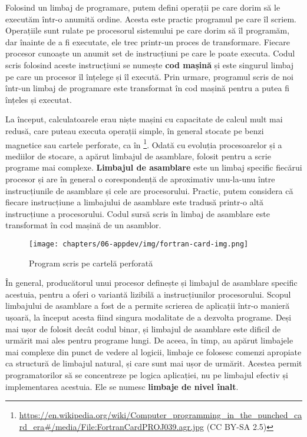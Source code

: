 Folosind un limbaj de programare, putem defini operații pe care dorim să le executăm într-o anumită ordine.
Acesta este practic programul pe care îl scriem.
Operațiile sunt rulate pe procesorul sistemului pe care dorim să îl programăm, dar înainte de a fi executate, ele trec printr-un proces de transformare.
Fiecare procesor cunoaște un anumit set de instrucțiuni pe care le poate executa.
Codul scris folosind aceste instrucțiuni se numește \textbf{cod mașină} și este singurul limbaj pe care un procesor îl înțelege și îl execută.
Prin urmare, programul scris de noi într-un limbaj de programare este transformat în cod mașină pentru a putea fi înțeles și executat.

La început, calculatoarele erau niște mașini cu capacitate de calcul mult mai redusă, care puteau executa operații simple, în general stocate pe benzi magnetice sau cartele perforate, ca în \footnote{\url{https://en.wikipedia.org/wiki/Computer_programming_in_the_punched_card_era\#/media/File:FortranCardPROJ039.agr.jpg} (CC BY-SA 2.5)}.
Odată cu evoluția procesoarelor și a mediilor de stocare, a apărut limbajul de asamblare, folosit pentru a scrie programe mai complexe.
\textbf{Limbajul de asamblare} este un limbaj specific fiecărui procesor și are în general o corespondență de aproximativ unu-la-unu între instrucțiunile de asamblare și cele are procesorului.
Practic, putem considera că fiecare instrucțiune a limbajului de asamblare este tradusă printr-o altă instrucțiune a procesorului.
Codul sursă scris în limbaj de asamblare este transformat în cod mașină de un asamblor.

\begin{figure}[!htbp]
  \centering
  \texttt{[image: chapters/06-appdev/img/fortran-card-img.png]}
  \caption{Program scris pe cartelă perforată}
  \label{fig:appdev:card}
\end{figure}

În general, producătorul unui procesor definește și limbajul de asamblare specific acestuia, pentru a oferi o variantă lizibilă a instrucțiunilor procesorului.
Scopul limbajului de asamblare a fost de a permite scrierea de aplicații într-o manieră ușoară, la început acesta fiind singura modalitate de a dezvolta programe.
Deși mai ușor de folosit decât codul binar, și limbajul de asamblare este dificil de urmărit mai ales pentru programe lungi.
De aceea, în timp, au apărut limbajele mai complexe din punct de vedere al logicii, limbaje ce folosesc comenzi apropiate ca structură de limbajul natural, și care sunt mai ușor de urmărit.
Acestea permit programatorilor să se concentreze pe logica aplicației, nu pe limbajul efectiv și implementarea acestuia.
Ele se numesc \textbf{limbaje de nivel înalt}.

